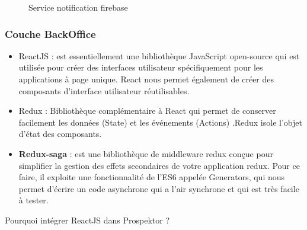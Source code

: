 \begin{figure}[H]
	\caption{\label{fig:my-label} Service notification firebase}
\end{figure}

\subsubsection{Couche BackOffice}
\begin{itemize}

\item \textcolor{react}{ReactJS} : est essentiellement une biblioth\`eque JavaScript open-source qui est utilis\'ee pour cr\'eer des interfaces utilisateur sp\'ecifiquement pour les applications \`a page unique. React nous permet \'egalement de cr\'eer des composants d'interface utilisateur r\'eutilisables.

\item \textcolor{redux}{Redux} : Biblioth\`eque compl\'ementaire \`a React qui permet de conserver facilement les donn\'ees (State) et les \'ev\'enements (Actions) .Redux isole l'objet d'\'etat des composants.

\item \textbf{Redux-saga} : est une biblioth\`eque de middleware redux con\c{c}ue pour simplifier la gestion des effets secondaires de votre application redux. Pour ce faire, il exploite une fonctionnalit\'e de l'ES6 appel\'ee Generators, qui nous permet d'\'ecrire un code asynchrone qui a l'air synchrone et qui est tr\`es facile \`a tester.
\end{itemize}


Pourquoi int\'egrer ReactJS dans Prospektor ?

